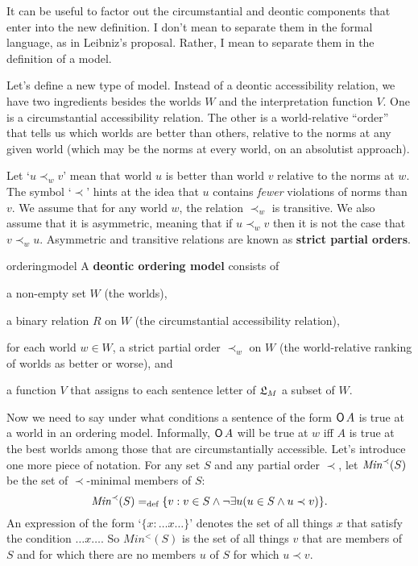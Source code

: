 It can be useful to factor out the circumstantial and deontic components that
enter into the new definition. I don't mean to separate them in the formal
language, as in Leibniz's proposal. Rather, I mean to separate them in the
definition of a model.

Let's define a new type of model. Instead of a deontic accessibility relation,
we have two ingredients besides the worlds $W$ and the interpretation
function $V$. One is a circumstantial accessibility relation. The other is a
world-relative ``order'' that tells us which worlds are better than others,
relative to the norms at any given world (which may be the norms at every world,
on an absolutist approach).

Let `$u \prec_w v$' mean that world $u$ is better than world $v$ relative to the
norms at $w$. The symbol `$\prec$' hints at the idea that $u$ contains
\emph{fewer} violations of norms than $v$. We assume that for any world $w$,
the relation $\prec_w$ is transitive. We also assume that it is asymmetric,
meaning that if $u \prec_w v$ then it is not the case that $v \prec_w u$.
Asymmetric and transitive relations are known as \textbf{strict partial orders}.

\begin{definition}{}{orderingmodel}
  A \textbf{deontic ordering model} consists of
  \vspace{-3mm}
  \begin{itemize*}
    \item a non-empty set $W$ (the worlds),
    \item a binary relation $R$ on $W$ (the circumstantial accessibility
    relation),
    \item for each world $w\in W$, a strict partial order $\prec_w$ on $W$ (the
    world-relative ranking of worlds as better or worse), and
    \item a function $V$ that assigns to each sentence letter of $\mathfrak{L}_M$ a subset
    of $W$.
  \end{itemize*}
\end{definition}

Now we need to say under what conditions a sentence of the form $\operatorname{\mathsf{O}} A$ is true
at a world in an ordering model. Informally, $\operatorname{\mathsf{O}} A$ will be true at $w$ iff
$A$ is true at the best worlds among those that are circumstantially accessible.
Let's introduce one more piece of notation. For any set $S$ and any
partial order $\prec$, let $\emph{Min}^{\prec}(S)$ be the set of $\prec$-minimal
members of $S$:
\[
  \emph{Min}^{\prec}(S) =_\text{def} \{ v: v \in S \land \neg\exists u(u \in S \land u \prec v) \}.
\]
An expression of the form `$\{ x: \ldots x \ldots \}$' denotes the set of all
things $x$ that satisfy the condition $\ldots x \ldots$. So $Min^{<}(S)$ is the
set of all things $v$ that are members of $S$ and for which there are no members
$u$ of $S$ for which $u \prec v$.

